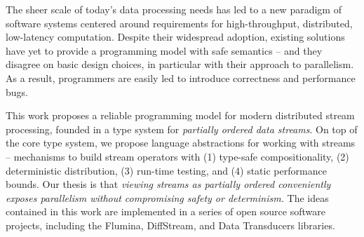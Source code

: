 The sheer scale of today's data processing needs has led to a new paradigm of software systems centered around requirements for high-throughput, distributed, low-latency computation.
Despite their widespread adoption, existing solutions have yet to provide a programming model with safe semantics -- and they disagree on basic design choices, in particular with their approach to parallelism. As a result, \naive{} programmers are easily led to introduce correctness and performance bugs.

This work proposes a reliable programming model for modern distributed stream processing, founded in a type system for \emph{partially ordered data streams}. On top of the core type system, we propose language abstractions for working with streams -- mechanisms to build stream operators with (1) type-safe compositionality, (2) deterministic distribution, (3) run-time testing, and (4) static performance bounds. Our thesis is that \emph{viewing streams as partially ordered conveniently exposes parallelism without compromising safety or determinism.} The ideas contained in this work are implemented in a series of open source software projects, including the Flumina, DiffStream, and Data Transducers libraries.
